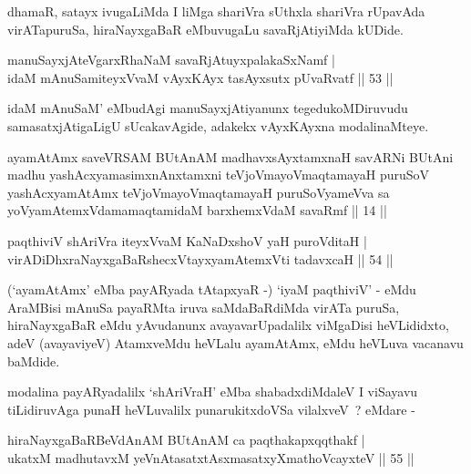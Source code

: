 
\begin{artha}
dhamaR, satayx ivugaLiMda I liMga shariVra sUthxla shariVra rUpavAda virATapuruSa, hiraNayxgaBaR eMbuvugaLu savaRjAtiyiMda kUDide.
\end{artha}

\begin{shl}
manuSayxjAteVgarxRhaNaM savaRjAtuyxpalakaSxNamf |\\
idaM mAnuSamiteyxVvaM vAyxKAyx tasAyxsutx pUvaRvatf \hfill || 53 ||
\end{shl}

\begin{artha}
idaM mAnuSaM' eMbudAgi manuSayxjAtiyanunx tegedukoMDiruvudu samasatxjAtigaLigU sUcakavAgide, adakekx vAyxKAyxna modalinaMteye.
\end{artha}


\begin{kandikeshl}
ayamAtAmx saveVRSAM BUtAnAM madhavxsAyxtamxnaH savARNi BUtAni madhu yashAcxyamasimxnAnxtamxni teVjoVmayoV\s maqtamayaH puruSoV yashAcxyamAtAmx teVjoVmayoV\s maqtamayaH puruSoV\s yameVva sa yoV\s yamAtemxVdamamaqtamidaM barxhemxVdaM savaRmf || 14 ||
\end{kandikeshl}

\begin{shl}
paqthiviV shAriVra iteyxVvaM KaNaDxshoV yaH puroVditaH |\\
virADiDhxraNayxgaBaRshecxVtayxyamAtemxVti tadavxcaH \hfill || 54 ||
\end{shl}

\begin{artha}
(`ayamAtAmx' eMba payARyada tAtapxyaR -) `iyaM paqthiviV' - eMdu   AraMBisi mAnuSa payaRMta iruva saMdaBaRdiMda virATa puruSa,   hiraNayxgaBaR eMdu yAvudanunx avayavarUpadalilx viMgaDisi   heVLididxto, adeV (avayaviyeV) AtamxveMdu heVLalu ayamAtAmx, eMdu   heVLuva vacanavu baMdide.
\end{artha}

\begin{artha}
modalina payARyadalilx `shAriVraH' eMba shabadxdiMdaleV I viSayavu tiLidiruvAga punaH heVLuvalilx punarukitxdoVSa vilalxveV~? 
eMdare -
\end{artha}

\begin{shl}
hiraNayxgaBaRBeVdAnAM BUtAnAM ca paqthakapxqqthakf |\\
ukatxM madhutavxM yeVnAtasatxtAsxmasatxyXmathoVcayxteV \hfill || 55 ||
\end{shl}

